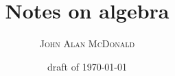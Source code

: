 \documentclass[10pt,openany]{book}
\title{Notes on algebra}
\author{\textsc{John Alan McDonald}}
\date{draft of \today}
\begin{document}
\maketitle

\frontmatter

\begingroup
\let\onecolumn\twocolumn
\sffamily
\tableofcontents
\rmfamily
\endgroup

\mainmatter

\cite{wiki:algebraic-structure,wiki:Outline-of-algebraic-structures}



\appendix

\backmatter



\end{document}
